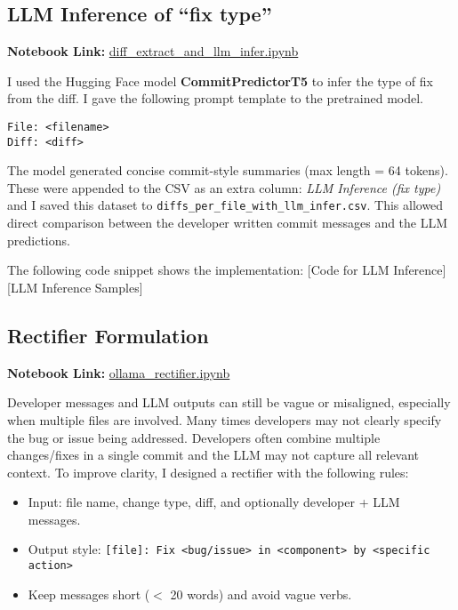 \documentclass[10pt,a4paper]{report}
\begin{document}
\subsection{LLM Inference of ``fix type''}
\textbf{Notebook Link:} \href{https://github.com/ShardulJunagade/cs202-stt/lab2/diff_extract_and_llm_infer.ipynb}{diff\_extract\_and\_llm\_infer.ipynb}

I used the Hugging Face model \textbf{CommitPredictorT5} to infer the type of fix from the diff. I gave the following prompt template to the pretrained model.
\begin{verbatim}
File: <filename>
Diff: <diff>
\end{verbatim}
The model generated concise commit-style summaries (max length = 64 tokens). These were appended to the CSV as an extra column: \textit{LLM Inference (fix type)} and I saved this dataset to \texttt{diffs\_per\_file\_with\_llm\_infer.csv}. This allowed direct comparison between the developer written commit messages and the LLM predictions.

The following code snippet shows the implementation:
[Code for LLM Inference]
[LLM Inference Samples]

\subsection{Rectifier Formulation}
\textbf{Notebook Link:} \href{https://github.com/ShardulJunagade/cs202-stt/lab2/ollama_rectifier.ipynb}{ollama\_rectifier.ipynb}

Developer messages and LLM outputs can still be vague or misaligned, especially when multiple files are involved. Many times developers may not clearly specify the bug or issue being addressed. Developers often combine multiple changes/fixes in a single commit and the LLM may not capture all relevant context. To improve clarity, I designed a rectifier with the following rules:
\begin{itemize}[itemsep=0.05em, topsep=0pt]
    \item Input: file name, change type, diff, and optionally developer + LLM messages.
    \item Output style: \texttt{[file]: Fix <bug/issue> in <component> by <specific action>}
    \item Keep messages short ($<$ 20 words) and avoid vague verbs.
\end{itemize}
\end{document}
